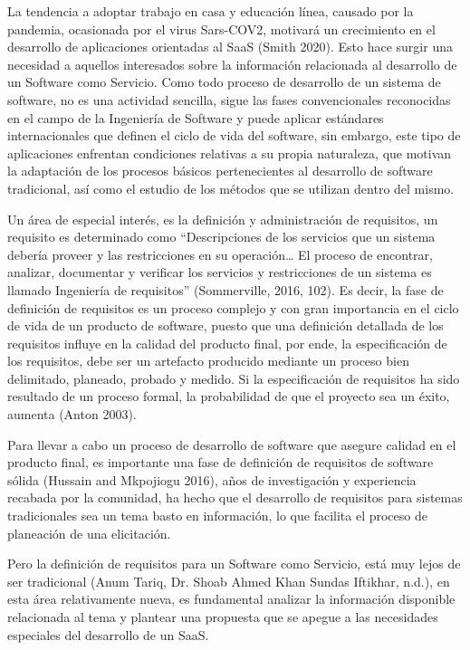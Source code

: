 \documentclass{article}
\begin{document}
La tendencia a adoptar trabajo en casa y educación línea, causado por la pandemia, ocasionada por el virus Sars-COV2, motivará un crecimiento en el desarrollo de aplicaciones orientadas al SaaS (Smith 2020). Esto hace 
surgir una necesidad a aquellos interesados sobre la información relacionada al desarrollo de un Software como Servicio.
Como todo proceso de desarrollo de un sistema de software, no es una actividad sencilla, sigue las fases convencionales reconocidas en el campo de la Ingeniería de Software y puede aplicar estándares internacionales 
que definen el ciclo de vida del software, sin embargo, este tipo de aplicaciones enfrentan condiciones relativas a su propia naturaleza, que motivan la adaptación de los procesos básicos pertenecientes al desarrollo de software 
tradicional, así como el estudio de los métodos que se utilizan dentro del mismo.


Un área de especial interés, es la definición y administración de requisitos, un requisito es determinado como “Descripciones de los servicios que un sistema debería proveer y las restricciones en su operación… El proceso de encontrar, analizar, 
documentar y verificar los servicios y restricciones de un sistema es llamado Ingeniería de requisitos” (Sommerville, 2016, 102). Es decir, la fase de definición de requisitos es un proceso complejo y con gran importancia en el ciclo 
de vida de un producto de software, puesto que una definición detallada de los requisitos influye en la calidad del producto final, por ende, la especificación de los requisitos, debe ser un artefacto producido mediante un 
proceso bien delimitado, planeado, probado y medido. Si la especificación de requisitos ha sido resultado de un proceso formal, la probabilidad de que el proyecto sea un éxito, aumenta (Anton 2003).

Para llevar a cabo un proceso de desarrollo de software que asegure calidad en el producto final, es importante una fase de definición de requisitos de software sólida (Hussain and Mkpojiogu 2016), años de investigación y 
experiencia recabada por la comunidad, ha hecho que el desarrollo de requisitos para sistemas tradicionales sea un tema basto en información, lo que facilita el proceso de planeación de una elicitación.

Pero la definición de requisitos para un Software como Servicio, está muy lejos de ser tradicional (Anum Tariq, Dr. Shoab Ahmed Khan Sundas Iftikhar, n.d.), en esta área relativamente nueva, es fundamental analizar la 
información disponible relacionada al tema y plantear una propuesta que se apegue a las necesidades especiales del desarrollo de un SaaS. 
\end{document}
